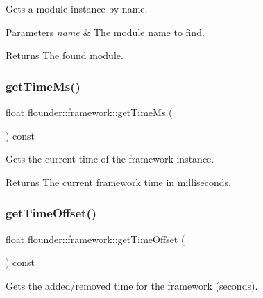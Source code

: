 Gets a module instance by name. 


\begin{DoxyParams}{Parameters}
{\em name} & The module name to find. \\
\hline
\end{DoxyParams}
\begin{DoxyReturn}{Returns}
The found module. 
\end{DoxyReturn}
\mbox{\label{classflounder_1_1framework_a8d8f401ca64f2b4f7a8389049b83de92}} 
\subsubsection{\texorpdfstring{get\+Time\+Ms()}{getTimeMs()}}
{\footnotesize\ttfamily float flounder\+::framework\+::get\+Time\+Ms (\begin{DoxyParamCaption}{ }\end{DoxyParamCaption}) const\hspace{0.3cm}{\ttfamily [inline]}}



Gets the current time of the framework instance. 

\begin{DoxyReturn}{Returns}
The current framework time in milliseconds. 
\end{DoxyReturn}
\mbox{\label{classflounder_1_1framework_aa85d7cdc20c0f8b47aee5dff06d03ae3}} 
\subsubsection{\texorpdfstring{get\+Time\+Offset()}{getTimeOffset()}}
{\footnotesize\ttfamily float flounder\+::framework\+::get\+Time\+Offset (\begin{DoxyParamCaption}{ }\end{DoxyParamCaption}) const\hspace{0.3cm}{\ttfamily [inline]}}



Gets the added/removed time for the framework (seconds). 


